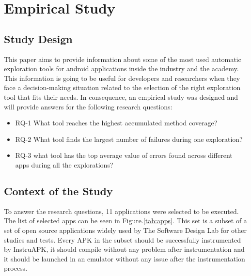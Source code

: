 
\chapter{Empirical Study} %

\label{Chapter4} %

\section{Study Design}\label{sec:studydesign}

This paper aims to provide information about some of the most used automatic exploration tools for android applications inside the industry and the academy. This information is going to be useful for developers and researchers when they face a decision-making situation related to the selection of the right exploration tool that fits their needs. In consequence, an empirical study was designed and will provide answers for the following research questions: 

\begin{itemize}

\item RQ-1 What tool reaches the highest accumulated method coverage?
\item RQ-2 What tool finds the largest number of failures during one exploration?
\item RQ-3 what tool has the top average value of errors found across different apps during all the explorations?
\end{itemize}

\section{Context of the Study} \label{sec:context}

To answer the research questions, 11 applications were selected to be executed. The list of selected apps can be seen in Figure.\ref{tab:apps}. This set is a subset of a set of open source applications widely used by  The Software Design Lab for other studies and tests. Every APK in the subset should be successfully instrumented by InstruAPK, it should compile without any problem after instrumentation and it should be launched in an emulator without any issue after the instrumentation process.

